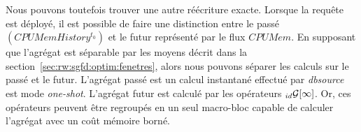 Nous pouvons toutefois trouver une autre réécriture exacte. Lorsque la requête est déployé, il est possible de faire une distinction entre le passé $(CPUMemHistory^{t_0})$ et le futur représenté par le flux $CPUMem$. En supposant que l'agrégat est séparable par les moyens décrit dans la section~\ref{sec:rw:sgfd:optim:fenetres}, alors nous pouvons séparer les calculs sur le passé et le futur. L'agrégat passé est un calcul instantané effectué par \textit{dbsource} est mode \textit{one-shot}. L'agrégat futur est calculé par les opérateurs $_{id}\mathcal{G}[\infty]$. Or, ces opérateurs peuvent être regroupés en un seul macro-bloc capable de calculer l'agrégat avec un coût mémoire borné.
